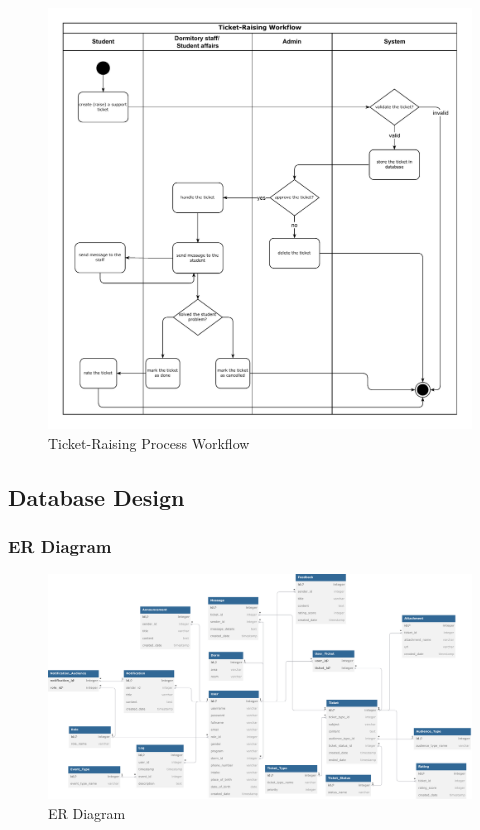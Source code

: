 \begin{figure}[H]
	\centering
	\includegraphics[width=0.84\columnwidth]{graphics/sys-workflow.pdf}
	\caption{Ticket-Raising Process Workflow}
	\label{fig:ticket-raising-workflow}
\end{figure}


\subsection{Database Design}
	\subsubsection{ER Diagram}
	\begin{figure}[H]
		\centering
		\includegraphics[width=1\columnwidth]{graphics/er-diagram.pdf}
		\caption{ER Diagram}
		\label{fig:er-diagram}
	\end{figure}


